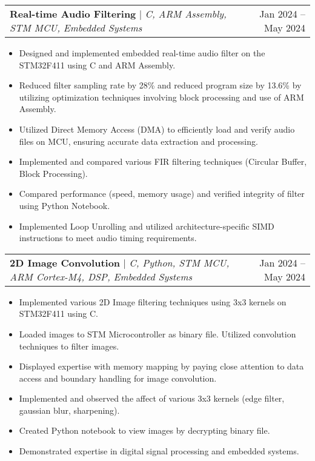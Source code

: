 \documentclass[A4,10pt]{article}
\makeatletter
\newcommand{\resumeItem}[1]{
  \item\small{
    {#1 \vspace{-2pt}}
  }
}
\newcommand{\resumeProjectHeading}[2]{
    \item
    \begin{tabular*}{0.97\textwidth}{l@{\extracolsep{\fill}}r}
      \small#1 & #2 \\
    \end{tabular*}\vspace{-7pt}
}
\newcommand{\resumeItemListStart}{\begin{itemize}}
\newcommand{\resumeItemListEnd}{\end{itemize}\vspace{-5pt}}
\makeatother
\begin{document}
        \resumeProjectHeading
        {\textbf{Real-time Audio Filtering} $|$ \emph{C, ARM Assembly, STM MCU, Embedded Systems}}{Jan 2024 -- May 2024}
        \resumeItemListStart
          \resumeItem{Designed and implemented embedded real-time audio filter on the STM32F411 using C and ARM Assembly.}
          \resumeItem{Reduced filter sampling rate by 28\% and reduced program size by 13.6\% by utilizing optimization techniques involving block processing and use of ARM Assembly.}
          \resumeItem{Utilized Direct Memory Access (DMA) to efficiently load and verify audio files on MCU, ensuring accurate data extraction and processing.}
          \resumeItem{Implemented and compared various FIR filtering techniques (Circular Buffer, Block Processing).}
          \resumeItem{Compared performance (speed, memory usage) and verified integrity of filter using Python Notebook.}
          \resumeItem{Implemented Loop Unrolling and utilized architecture-specific SIMD instructions to meet audio timing requirements.}
        \resumeItemListEnd
        
        \resumeProjectHeading
        {\textbf{2D Image Convolution} $|$ \emph{C, Python, STM MCU, ARM Cortex-M4, DSP, Embedded Systems}}{Jan 2024 -- May 2024}
        \resumeItemListStart
          \resumeItem{Implemented various 2D Image filtering techniques using 3x3 kernels on STM32F411 using C.}
          \resumeItem{Loaded images to STM Microcontroller as binary file. Utilized convolution techniques to filter images.}
          \resumeItem{Displayed expertise with memory mapping by paying close attention to data access and boundary handling for image convolution.}
          \resumeItem{Implemented and observed the affect of various 3x3 kernels (edge filter, gaussian blur, sharpening).}
          \resumeItem{Created Python notebook to view images by decrypting binary file.}
          \resumeItem{Demonstrated expertise in digital signal processing and embedded systems.}
        \resumeItemListEnd
\end{document}
